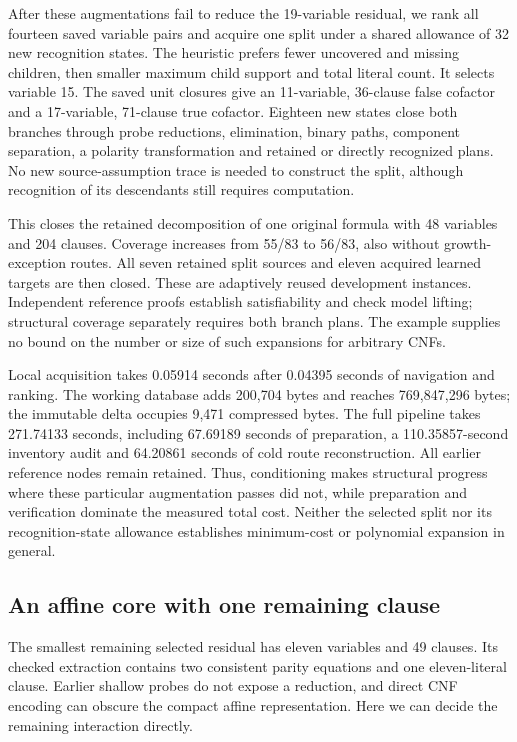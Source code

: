 \documentclass[11pt,a4paper]{article}
\numberwithin{equation}{section}
\theoremstyle{plain}
\theoremstyle{definition}
\theoremstyle{remark}
\begin{document}
After these augmentations fail to reduce the 19-variable residual, we rank all fourteen saved variable pairs and acquire one split under a shared allowance of 32 new recognition states. The heuristic prefers fewer uncovered and missing children, then smaller maximum child support and total literal count. It selects variable 15. The saved unit closures give an 11-variable, 36-clause false cofactor and a 17-variable, 71-clause true cofactor. Eighteen new states close both branches through probe reductions, elimination, binary paths, component separation, a polarity transformation and retained or directly recognized plans. No new source-assumption trace is needed to construct the split, although recognition of its descendants still requires computation.

This closes the retained decomposition of one original formula with 48 variables and 204 clauses. Coverage increases from 55/83 to 56/83, also without growth-exception routes. All seven retained split sources and eleven acquired learned targets are then closed. These are adaptively reused development instances. Independent reference proofs establish satisfiability and check model lifting; structural coverage separately requires both branch plans. The example supplies no bound on the number or size of such expansions for arbitrary CNFs.

Local acquisition takes 0.05914 seconds after 0.04395 seconds of navigation and ranking. The working database adds 200,704 bytes and reaches 769,847,296 bytes; the immutable delta occupies 9,471 compressed bytes. The full pipeline takes 271.74133 seconds, including 67.69189 seconds of preparation, a 110.35857-second inventory audit and 64.20861 seconds of cold route reconstruction. All earlier reference nodes remain retained. Thus, conditioning makes structural progress where these particular augmentation passes did not, while preparation and verification dominate the measured total cost. Neither the selected split nor its recognition-state allowance establishes minimum-cost or polynomial expansion in general.

\subsection{An affine core with one remaining clause}
\label{sec:affine-one-clause}

The smallest remaining selected residual has eleven variables and 49 clauses. Its checked extraction contains two consistent parity equations and one eleven-literal clause. Earlier shallow probes do not expose a reduction, and direct CNF encoding can obscure the compact affine representation. Here we can decide the remaining interaction directly.
\end{document}
